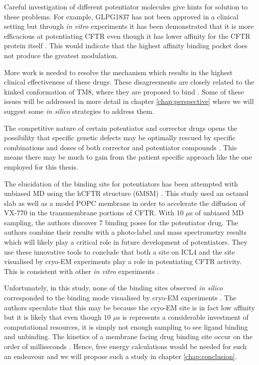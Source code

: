 Careful investigation of different potentiator molecules give hints for solution to these problems. For example, GLPG1837 has not been approved in a clinical setting but through \textit {in vitro} experiments it has been demonstrated that it is more efficacious at potentiating CFTR even though it has lower affinity for the CFTR protein itself \cite{vanderplas2018}. This would indicate that the highest affinity binding pocket does not produce the greatest modulation. 

More work is needed to resolve the mechanism which results in the highest clinical effectiveness of these drugs. These disagreements are closely related to the kinked conformation of TM8, where they are proposed to bind \cite{liu2019, yeh2019}. Some of these issues will be addressed in more detail in chapter \ref{chap:perspective} where we will suggest some \textit{in silico} strategies to address them. 

The competitive nature of certain potentiator and corrector drugs opens the possibility that specific genetic defects may be optimally rescued by specific combinations and doses of both corrector and potentiator compounds \cite{csanady2019}. This means there may be much to gain from the patient specific approach like the one employed for this thesis. 

The elucidation of the binding site for potentiators has been attempted with unbiased MD using the hCFTR structure (6MSM) \cite{laselva2021a}. This study used an octanol slab as well as a model POPC membrane in order to accelerate the diffusion of VX-770 in the transmembrane portions of CFTR. With 10 $\mu$s of unbiased MD sampling, the authors discover 7 binding poses for the potentiator drug. The authors combine their results with a photo-label and mass spectrometry results which will likely play a critical role in future development of potentiators. They use these innovative tools to conclude that both a site on ICL4 and the site visualised by cryo-EM experiments play a role in potentiating CFTR activity. This is consistent with other \textit{in vitro} experiments \cite{csanady2019}.

Unfortunately, in this study, none of the binding sites observed \textit{in silico} corresponded to the binding mode visualised by cryo-EM experiments \cite{liu2019}. The authors speculate that this may be because the cryo-EM site is in fact low affinity but it is likely that even though 10 $\mu$s is represents a considerable investment of computational resources, it is simply not enough sampling to see ligand binding and unbinding. The kinetics of a membrane facing drug binding site occur on the order of milliseconds \cite{weikl2016}. Hence, free energy calculations would be needed for such an endeavour and we will propose such a study in chapter \ref{chap:conclusion}. 


